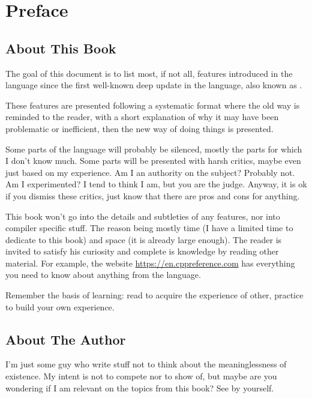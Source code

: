\chapter{Preface}

\section{About This Book}
The goal of this document is to list most, if not all, features
introduced in the \cpp language since the first well-known deep update
in the language, also known as .

These features are presented following a systematic format where the
old way is reminded to the reader, with a short explanation of why it
may have been problematic or inefficient, then the new way of doing
things is presented.

Some parts of the language will probably be silenced, mostly the parts
for which I don't know much. Some parts will be presented with harsh
critics, maybe even just based on my experience. Am I an authority on
the subject? Probably not. Am I experimented? I tend to think I am,
but you are the judge. Anyway, it is ok if you dismiss these critics,
just know that there are pros and cons for anything.

This book won't go into the details and subtleties of any features,
nor into compiler specific stuff. The reason being mostly time (I have
a limited time to dedicate to this book) and space (it is already
large enough). The reader is invited to satisfy his curiosity and
complete is knowledge by reading other material. For example, the
website \url{https://en.cppreference.com} has everything you need to
know about anything from the language.

Remember the basis of learning: read to acquire the experience of
other, practice to build your own experience.

\section{About The Author}

I'm just some guy who write stuff not to think about the
meaninglessness of existence. My intent is not to compete nor to show
of, but maybe are you wondering if I am relevant on the topics from
this book? See by yourself.

